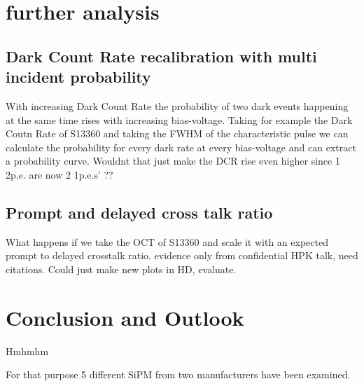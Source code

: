 \documentclass[12pt,article,type=msc,colorback,accentcolor=tud9c]{tudthesis}
\begin{document}
{%
\clearpage
\section{\Large further analysis}
\subsection{Dark Count Rate recalibration with multi incident probability}

With increasing Dark Count Rate the probability of two dark events happening at the same time rises with increasing bias-voltage. Taking for example the Dark Coutn Rate of S13360 and taking the FWHM of the characteristic pulse we can calculate the probability for every dark rate at every bias-voltage and can extract a probability curve. 
Wouldnt that just make the DCR rise even higher since 1 2p.e. are now 2 1p.e.s' ??




\subsection{Prompt and delayed cross talk ratio}
What happens if we take the OCT of S13360 and scale it with an expected prompt to delayed crosstalk ratio. evidence only from confidential HPK talk, need citations. Could just make new plots in HD, evaluate.



\section{\Large Conclusion and Outlook}

Hmhmhm

For that purpose 5 different SiPM from two manufacturers have been examined.

\newpage
}
\end{document}
